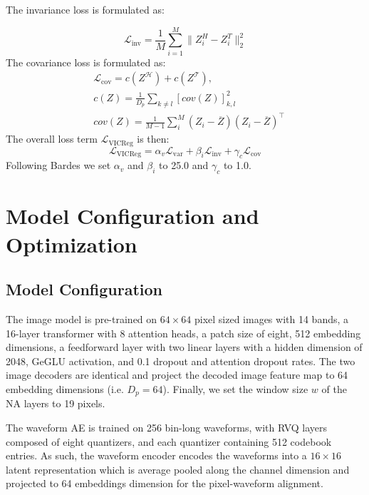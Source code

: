 The invariance loss is formulated as:

\begin{equation}
    \label{inv_loss}
    \mathcal{L}_{\text{inv}}= \frac{1}{M} \sum_{i=1}^M \| Z_i^H - Z_i^T \|_2^2 
\end{equation}
The covariance loss is formulated as:
\begin{equation}
    \label{cov_loss}
    \begin{split}
    & \mathcal{L}_{\text{cov}} = c(Z^\mathcal{H}) + c(Z^\mathcal{T}), \\
    & c(Z) = \frac{1}{D_p}\sum_{k\neq l}[cov(Z)]^2_{k,l} \\
    & cov(Z) = \frac{1}{M-1}\sum_{i}^M(Z_i-\overline{Z})(Z_i-\overline{Z})^\top
     \end{split}
\end{equation}
The overall loss term $\mathcal{L}_{\text{VICReg}}$ is then:
\begin{equation}
    \label{loss_vicreg}
    \mathcal{L}_{\text{VICReg}} = \alpha_v \mathcal{L}_{\text{var}} + \beta_i\mathcal{L}_{\text{inv}} + \gamma_c \mathcal{L}_{\text{cov}}
\end{equation}
Following Bardes  we set $\alpha_v$ and $\beta_i$ to 25.0 and $\gamma_c$ to 1.0.

\section{Model Configuration and Optimization}\label{appendix:model_config_and_optim}
\subsection{Model Configuration} The image model is pre-trained on $64 \times 64$ pixel sized images with 14 bands, a 16-layer transformer with 8 attention heads, a patch size of eight, 512 embedding dimensions, a feedforward layer with two linear layers with a hidden dimension of 2048, GeGLU activation, and 0.1 dropout and attention dropout rates. The two image decoders are identical and project the decoded image feature map to 64 embedding dimensions (i.e. $D_p = 64$). Finally, we set the window size $w$ of the NA layers to 19 pixels.

The waveform AE is trained on 256 bin-long waveforms, with RVQ layers composed of eight quantizers, and each quantizer containing 512 codebook entries. As such, the waveform encoder encodes the waveforms into a $16 \times 16$ latent representation which is average pooled along the channel dimension and projected to 64 embeddings dimension for the pixel-waveform alignment. 

